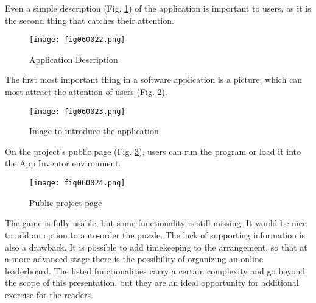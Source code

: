 Even a simple description (Fig. \ref{fig060022}) of the application is important to users, as it is the second thing that catches their attention.

\begin{figure}[H]
   \centering
   \texttt{[image: fig060022.png]}
   \caption{Application Description}
\label{fig060022}
\end{figure}

The first most important thing in a software application is a picture, which can most attract the attention of users (Fig. \ref{fig060023}).

\begin{figure}[H]
   \centering
   \texttt{[image: fig060023.png]}
   \caption{Image to introduce the application}
\label{fig060023}
\end{figure}

On the project's public page (Fig. \ref{fig060024}), users can run the program or load it into the App Inventor environment.

\begin{figure}[H]
   \centering
   \texttt{[image: fig060024.png]}
   \caption{Public project page}
\label{fig060024}
\end{figure}

The game is fully usable, but some functionality is still missing. It would be nice to add an option to auto-order the puzzle. The lack of supporting information is also a drawback. It is possible to add timekeeping to the arrangement, so that at a more advanced stage there is the possibility of organizing an online leaderboard. The listed functionalities carry a certain complexity and go beyond the scope of this presentation, but they are an ideal opportunity for additional exercise for the readers.
